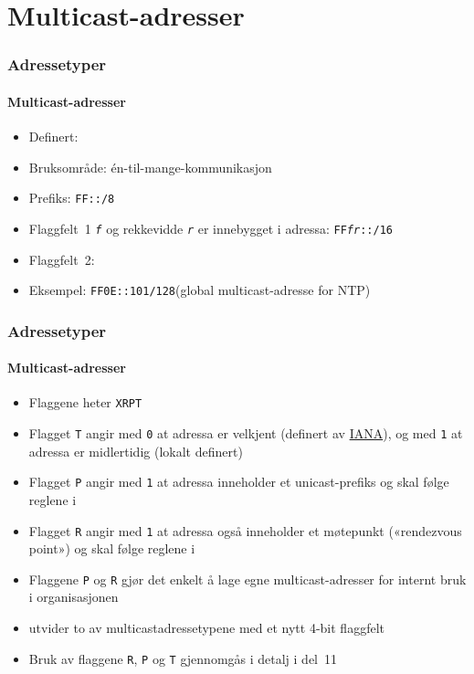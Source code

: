 \section{Multicast-adresser}
\begin{frame}
  \frametitle{Adressetyper}
  \framesubtitle{Multicast-adresser}
  \begin{itemize}
  \item Definert: 
  \item Bruksområde: én-til-mange-kommunikasjon
  \item Prefiks: \texttt{FF::/8}
  \item Flaggfelt~1 \texttt{\textit{f\/}} og rekkevidde
    \texttt{\textit{r\/}} er innebygget i adressa:
    \texttt{FF\textit{fr}::/16}
  \item Flaggfelt~2: 
  \item Eksempel: \texttt{FF0E::101/128}\hfill(global multicast-adresse
    for NTP)
  \end{itemize}
\end{frame}

\begin{frame}
  \frametitle{Adressetyper}
  \framesubtitle{Multicast-adresser}
  \begin{itemize}
  \item Flaggene heter \texttt{XRPT}
  \item Flagget \texttt{T} angir med \texttt{0} at adressa er velkjent
    (definert av \href{http://www.iana.org/}{IANA}), og med \texttt{1}
    at adressa er midlertidig (lokalt definert)
  \item Flagget \texttt{P} angir med \texttt{1} at adressa inneholder
    et unicast-prefiks og skal følge reglene i 
  \item Flagget \texttt{R} angir med \texttt{1} at adressa også
    inneholder et møtepunkt («rendezvous point») og skal følge reglene
    i 
  \item Flaggene \texttt{P} og \texttt{R} gjør det enkelt å lage egne
    multicast-adresser for internt bruk i organisasjonen
  \item {} utvider to av multicastadressetypene med et nytt
    4-bit flaggfelt
  \item Bruk av flaggene \texttt{R}, \texttt{P} og \texttt{T}
    gjennomgås i detalj i del~11
  \end{itemize}
\end{frame}

